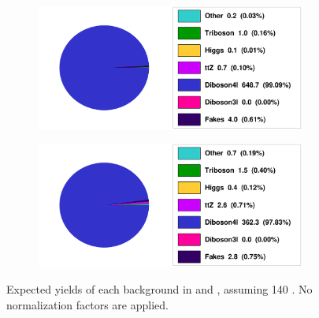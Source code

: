 \begin{figure}[tbp]
    \centering
    \begin{subfigure}[b]{0.49\textwidth}
      \centering
      \includegraphics[width=0.98\textwidth]{figs/rpvthreel/CRZZ_yields.png}
      \caption{}
      \label{fig:CRZZ_yields}
    \end{subfigure}
    \hfill
    \begin{subfigure}[b]{0.49\textwidth}
      \centering
      \includegraphics[width=0.98\textwidth]{figs/rpvthreel/VRZZ_yields.png}
      \caption{}
      \label{fig:VRZZ_yields}
    \end{subfigure}
  \caption[Expected yields of each background in \CRZZ and \VRZZ, assuming 140 \ifb. No normalization factors are applied.]
          {Expected yields of each background in \CRZZ and \VRZZ, assuming 140 \ifb. No normalization factors are applied.}
   \label{fig:CRVRZZ_yields}
\end{figure}

